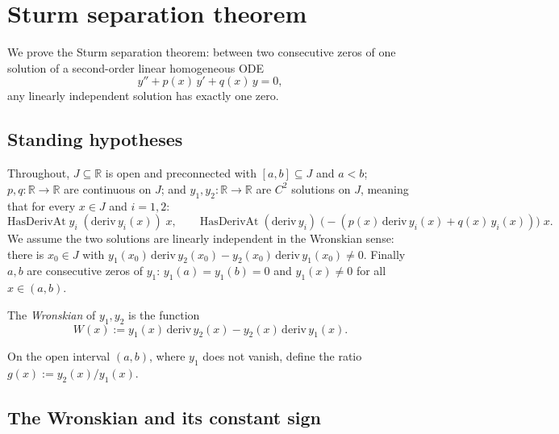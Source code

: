 


\section{Sturm separation theorem}

We prove the Sturm separation theorem: between two consecutive zeros of one
solution of a second-order linear homogeneous ODE
\[
    y'' + p(x)\,y' + q(x)\,y = 0,
\]
any linearly independent solution has exactly one zero.

\subsection{Standing hypotheses}

Throughout, $J \subseteq \mathbb{R}$ is open and preconnected with
$[a,b] \subseteq J$ and $a < b$; $p, q : \mathbb{R} \to \mathbb{R}$ are
continuous on $J$; and $y_1, y_2 : \mathbb{R} \to \mathbb{R}$ are $C^2$
solutions on $J$, meaning that for every $x \in J$ and $i = 1, 2$:
\[
    \mathrm{HasDerivAt}\;y_i\;(\mathrm{deriv}\,y_i(x))\;x, \qquad
    \mathrm{HasDerivAt}\;(\mathrm{deriv}\,y_i)\;
        \bigl(-(p(x)\,\mathrm{deriv}\,y_i(x) + q(x)\,y_i(x))\bigr)\;x.
\]
We assume the two solutions are linearly independent in the Wronskian sense:
there is $x_0 \in J$ with $y_1(x_0)\,\mathrm{deriv}\,y_2(x_0) -
y_2(x_0)\,\mathrm{deriv}\,y_1(x_0) \ne 0$. Finally $a, b$ are consecutive zeros
of $y_1$: $y_1(a) = y_1(b) = 0$ and $y_1(x) \ne 0$ for all $x \in (a,b)$.

\begin{definition}[Wronskian]
    \label{def:wronskian}
    \leanok
    The \emph{Wronskian} of $y_1, y_2$ is the function
    \[
        W(x) := y_1(x)\,\mathrm{deriv}\,y_2(x) - y_2(x)\,\mathrm{deriv}\,y_1(x).
    \]
\end{definition}

\begin{definition}
    \label{def:ratio}
    \leanok
    On the open interval $(a,b)$, where $y_1$ does not vanish, define the ratio
    $g(x) := y_2(x) / y_1(x)$.
\end{definition}

\subsection{The Wronskian and its constant sign}

